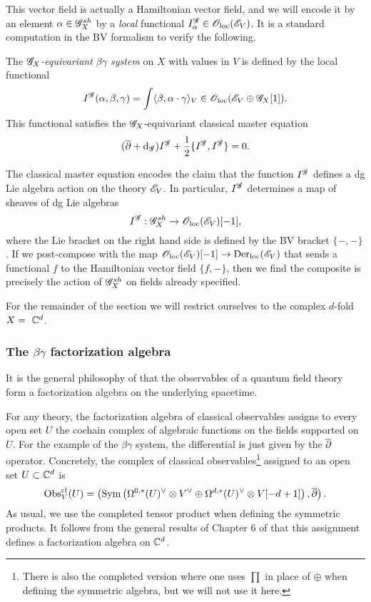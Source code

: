 This vector field is actually a Hamiltonian vector field, 
and we will encode it by an element $\alpha \in \mathscr G_X^{sh}$ by a {\em local} functional $I_\alpha^{\mathscr G} \in {\mathscr O}_{\rm loc}(\mathscr E_V)$. 
It is a standard computation in the BV formalism to verify the following.

\begin{dfn/lem}
The {\em $\mathscr G_X$-equivariant $\beta\gamma$ system} on $X$ with values in $V$ is defined by the local functional
\[
I^{\mathscr G}(\alpha, \beta, \gamma) = \int \langle\beta, \alpha \cdot \gamma\rangle_V \in {\mathscr O}_{\rm loc}(\mathscr E_V \oplus \mathscr G_X[1]) .
\]
This functional satisfies the $\mathscr G_X$-equivariant classical master equation
\[
(\overline{\partial} + {\rm d}_{\mathscr G}) I^{\mathscr G} + \frac{1}{2} \{I^{\mathscr G}, I^{\mathscr G}\} = 0 .
\] 
\end{dfn/lem}

The classical master equation encodes the claim that the function $I^{\mathscr G}$ defines a dg Lie algebra action on the theory $\mathscr E_V$. 
In particular, $I^{\mathscr G}$ determines a map of sheaves of dg Lie algebras 
\[
I^{\mathscr G} : \mathscr G^{sh}_X \to {\mathscr O}_{\rm loc}(\mathscr E_V)[-1],
\] 
where the Lie bracket on the right hand side is defined by the BV bracket $\{-,-\}$. 
If we post-compose with the map ${\mathscr O}_{\rm loc}(\mathscr E_V)[-1] \to {\rm Der}_{\rm loc}(\mathscr E_V)$ that sends a functional $f$ to the Hamiltonian vector field $\{f,-\}$,
then we find the composite is precisely the action of $\mathscr G^{sh}_X$ on fields already specified.

 For the remainder of the section we will restrict ourselves to the complex $d$-fold $X =~\mathbb C^d$. 

\subsubsection{The $\beta\gamma$ factorization algebra}

It is the general philosophy of \cite{CG1,CG2} that the observables of a quantum field theory form a factorization algebra on the underlying spacetime. 

For any theory, the factorization algebra of classical observables assigns to every open set $U$ the cochain complex of algebraic functions on the fields supported on $U$.  
For the example of the $\beta\gamma$ system, the differential is just given by the $\overline{\partial}$ operator. 
Concretely, the complex of classical observables\footnote{There is also the completed version where one uses $\prod$ in place of $\oplus$ when defining the symmetric algebra, but we will not use it here.} assigned to an open set $U \subset \mathbb C^d$ is
\[
{\rm Obs}^{{\rm cl}}_V(U) = \left({\rm Sym} \left(\Omega^{0,*}(U)^\vee \otimes V^\vee \oplus \Omega^{d,*}(U)^\vee \otimes V [-d+1]\right), \overline{\partial}\right) .
\]
As usual, we use the completed tensor product when defining the symmetric products. 
It follows from the general results of Chapter 6 of \cite{CG2} that this assignment defines a factorization algebra on $\mathbb C^d$. 

